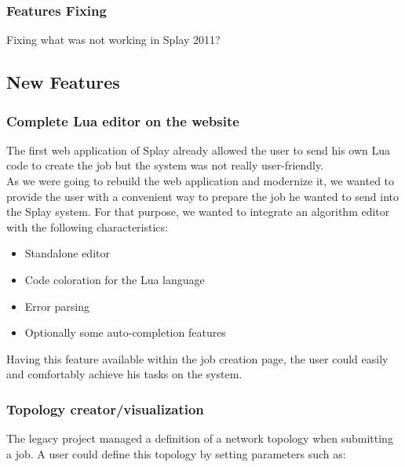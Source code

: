 \documentclass{eplmastersthesis}
\begin{document}
        \subsubsection{Features Fixing} %

          Fixing what was not working in Splay 2011?

      \subsection{New Features}


        \subsubsection{Complete Lua editor on the website}

          The first web application of Splay already allowed the user to send
          his own Lua code to create the job but the system was not really
          user-friendly.\\

          As we were going to rebuild the web application and modernize it,
          we wanted to provide the user with a convenient way to prepare
          the job he wanted to send into the Splay system. For that purpose,
          we wanted to integrate an algorithm editor with the following
          characteristics:

          \begin{itemize}
            \item Standalone editor
            \item Code coloration for the Lua language
            \item Error parsing
            \item Optionally some auto-completion features
          \end{itemize}

          Having this feature available within the job creation page, the user
          could easily and comfortably achieve his tasks on the system.

        \subsubsection{Topology creator/visualization}

          The legacy project managed a definition of a network topology when
          submitting a job. A user could define this topology by setting
          parameters such as:
\end{document}

